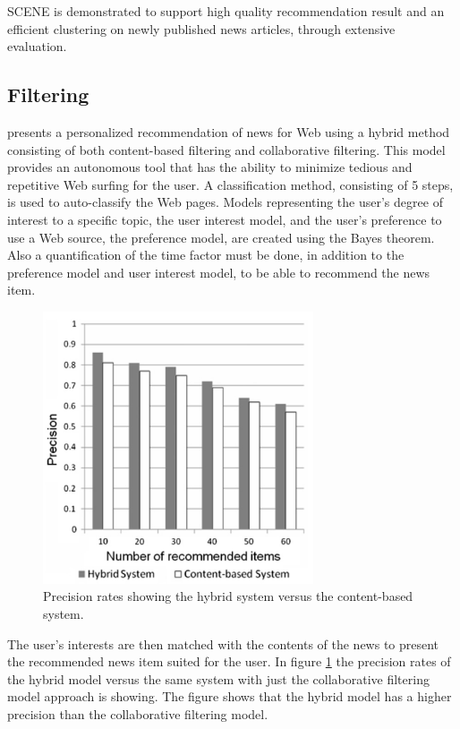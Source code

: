 SCENE is demonstrated to support high quality recommendation result and an efficient clustering on newly published news articles, through extensive evaluation.


\subsection{Filtering}

\cite{wen2012hybrid} presents a personalized recommendation of news for Web using a hybrid method consisting of both content-based filtering and collaborative filtering. This model provides an autonomous tool that has the ability to minimize tedious and repetitive Web surfing for the user. A classification method, consisting of 5 steps, is used to auto-classify the Web pages. Models representing the user's degree of interest to a specific topic, the user interest model, and the user's preference to use a Web source, the preference model, are created using the Bayes theorem. Also a quantification of the time factor must be done, in addition to the preference model and user interest model, to be able to recommend the news item.

\begin{figure}[!htbp]
\centering
\includegraphics[width=80mm]{GFX/tech/hybridApproachPrecisionRate.png}
\caption{Precision rates showing the hybrid system versus the content-based system.}
\label{hybrid_approach_precision_rate}
\end{figure}

The user's interests are then matched with the contents of the news to present the recommended news item suited for the user. In figure \ref{hybrid_approach_precision_rate} the precision rates of the hybrid model versus the same system with just the collaborative filtering model approach is showing. The figure shows that the hybrid model has a higher precision than the collaborative filtering model.


